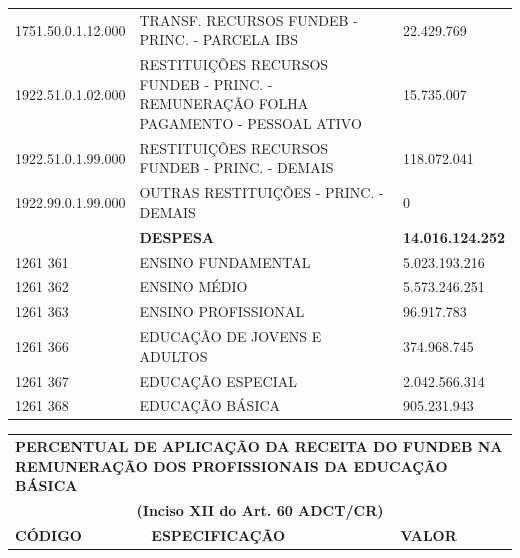 \documentclass{article}
\begin{document}
\begin{longtable}[c]{m{2.5cm}|m{14cm}|m{1.5cm}}
\multicolumn{1}{L{2.5cm}|}{1751.50.0.1.12.000} & \multicolumn{1}{L{14cm}|}{TRANSF. RECURSOS FUNDEB - PRINC. - PARCELA IBS} & \multicolumn{1}{R{1.5cm}}{22.429.769} \\
\multicolumn{1}{L{2.5cm}|}{1922.51.0.1.02.000} & \multicolumn{1}{L{14cm}|}{RESTITUIÇÕES RECURSOS FUNDEB - PRINC. - REMUNERAÇÃO FOLHA PAGAMENTO - PESSOAL ATIVO} & \multicolumn{1}{R{1.5cm}}{15.735.007} \\
\multicolumn{1}{L{2.5cm}|}{1922.51.0.1.99.000} & \multicolumn{1}{L{14cm}|}{RESTITUIÇÕES RECURSOS FUNDEB - PRINC. - DEMAIS} & \multicolumn{1}{R{1.5cm}}{118.072.041} \\
\multicolumn{1}{L{2.5cm}|}{1922.99.0.1.99.000} & \multicolumn{1}{L{14cm}|}{OUTRAS RESTITUIÇÕES - PRINC. - DEMAIS} & \multicolumn{1}{R{1.5cm}}{             0} \\
\hline
\multicolumn{1}{L{2.5cm}|}{ \textbf{}} & \multicolumn{1}{L{14cm}|}{ \textbf{DESPESA}} & \multicolumn{1}{R{1.5cm}}{ \textbf{14.016.124.252}} \\
\multicolumn{1}{L{2.5cm}|}{1261 361} & \multicolumn{1}{L{14cm}|}{ENSINO FUNDAMENTAL} & \multicolumn{1}{R{1.5cm}}{5.023.193.216} \\
\multicolumn{1}{L{2.5cm}|}{1261 362} & \multicolumn{1}{L{14cm}|}{ENSINO MÉDIO} & \multicolumn{1}{R{1.5cm}}{5.573.246.251} \\
\multicolumn{1}{L{2.5cm}|}{1261 363} & \multicolumn{1}{L{14cm}|}{ENSINO PROFISSIONAL} & \multicolumn{1}{R{1.5cm}}{96.917.783} \\
\multicolumn{1}{L{2.5cm}|}{1261 366} & \multicolumn{1}{L{14cm}|}{EDUCAÇÃO DE JOVENS E ADULTOS} & \multicolumn{1}{R{1.5cm}}{374.968.745} \\
\multicolumn{1}{L{2.5cm}|}{1261 367} & \multicolumn{1}{L{14cm}|}{EDUCAÇÃO ESPECIAL} & \multicolumn{1}{R{1.5cm}}{2.042.566.314} \\
\multicolumn{1}{L{2.5cm}|}{1261 368} & \multicolumn{1}{L{14cm}|}{EDUCAÇÃO BÁSICA} & \multicolumn{1}{R{1.5cm}}{905.231.943} \\\hline\hline\end{longtable}\noindent\begin{longtable}[c]{m{3cm}|m{12cm}|m{3cm}}\multicolumn{3}{C{19cm}}{\cellcolor{gray!50} \textcolor{myblack} {\footnotesize \textbf{PERCENTUAL DE APLICAÇÃO DA RECEITA DO FUNDEB NA REMUNERAÇÃO DOS PROFISSIONAIS \newline DA EDUCAÇÃO BÁSICA}}} \\\multicolumn{3}{c}{\cellcolor{gray!50} \textcolor{myblack} {\footnotesize \textbf{(Inciso XII do Art. 60 ADCT/CR)}}} \\\hline\hline \multicolumn{1}{L{3cm}|}{\textbf{CÓDIGO}} & \multicolumn{1}{C{12cm}|}{ \textbf{ESPECIFICAÇÃO}} & \multicolumn{1}{C{3cm}}{ \textbf{VALOR}} \\\hline\hline \hline\hline

\end{longtable}
\end{document}
